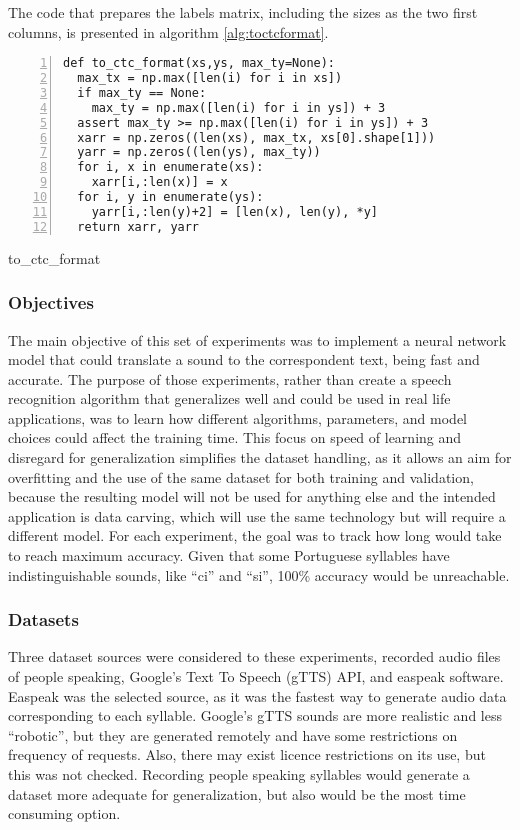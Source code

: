 The code that prepares the labels matrix, including the sizes as the two first columns, is presented in algorithm \ref{alg:toctcformat}.

\noindent
\begin{algorithm}

\begin{lstlisting}[frame=single, numbers=left]
def to_ctc_format(xs,ys, max_ty=None):
  max_tx = np.max([len(i) for i in xs])
  if max_ty == None:
    max_ty = np.max([len(i) for i in ys]) + 3
  assert max_ty >= np.max([len(i) for i in ys]) + 3
  xarr = np.zeros((len(xs), max_tx, xs[0].shape[1]))
  yarr = np.zeros((len(ys), max_ty))
  for i, x in enumerate(xs):
    xarr[i,:len(x)] = x
  for i, y in enumerate(ys):
    yarr[i,:len(y)+2] = [len(x), len(y), *y]
  return xarr, yarr
\end{lstlisting}
\caption{\label{alg:toctcformat}to\_ctc\_format}
\end{algorithm}

\subsubsection{Objectives}
The main objective of this set of experiments was to implement a neural network model that could translate a sound to the correspondent text, being fast and accurate. The purpose of those experiments, rather than create a speech recognition algorithm that generalizes well and could be used in real life applications, was to learn how different algorithms,  parameters, and model choices could affect the training time. This focus on speed of learning and disregard for generalization simplifies the dataset handling, as it allows an aim for overfitting and the use of the same dataset for both training and validation, because the resulting model will not be used for anything else and the intended application is data carving, which will use the same technology but will require a different model. For each experiment, the goal was to track how long would take to reach maximum accuracy. Given that some Portuguese syllables have indistinguishable sounds, like ``ci'' and ``si'', 100\% accuracy would be unreachable.

\subsubsection{Datasets}
Three dataset sources were considered to these experiments, recorded audio files of people speaking, Google's Text To Speech (gTTS) API, and easpeak software. Easpeak was the selected source, as it was the fastest way to generate audio data corresponding to each syllable. Google's gTTS sounds are more realistic and less ``robotic'', but they are generated remotely and have some restrictions on frequency of requests. Also, there may exist licence restrictions on its use, but this was not checked. Recording people speaking syllables would generate a dataset more adequate for generalization, but also would be the most time consuming option.

